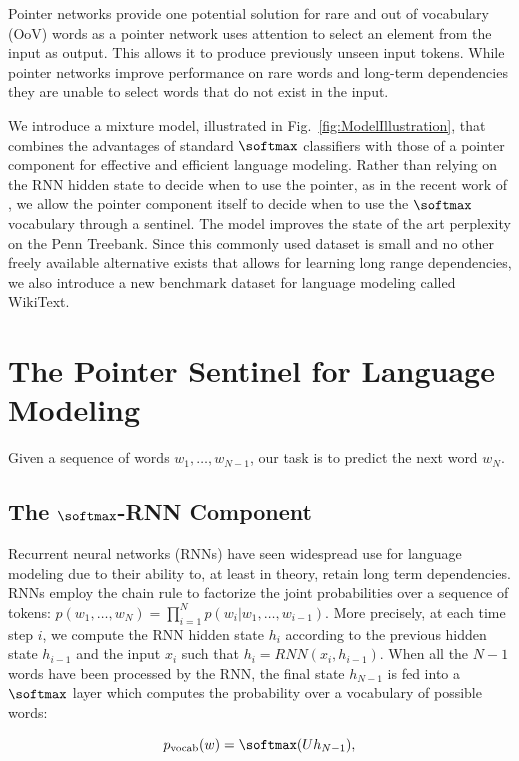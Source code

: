 Pointer networks \cite{Vinyals2015} provide one potential solution for rare and out of vocabulary (OoV) words as a pointer network uses attention to select an element from the input as output. This allows it to produce previously unseen input tokens. While pointer networks improve performance on rare words and long-term dependencies they are unable to select words that do not exist in the input.

We introduce a mixture model, illustrated in Fig.~\ref{fig:ModelIllustration}, that combines the advantages of standard $\softmax$ classifiers with those of a pointer component for effective and efficient language modeling. Rather than relying on the RNN hidden state to decide when to use the pointer, as in the recent work of \citet{Gulcehre2016}, we allow the pointer component itself to decide when to use the $\softmax$ vocabulary through a sentinel. The model improves the state of the art perplexity on the Penn Treebank. Since this commonly used dataset is small and no other freely available alternative exists that allows for learning long range dependencies, we also introduce a new benchmark dataset for language modeling called WikiText.

\section{The Pointer Sentinel for Language Modeling} Given a sequence of words $w_1, \ldots, w_{N-1}$, our task is to predict the next word $w_N$.

\subsection{The $\softmax$-RNN Component} Recurrent neural networks (RNNs) have seen widespread use for language modeling \cite{Mikolov2010} due to their ability to, at least in theory, retain long term dependencies. RNNs employ the chain rule to factorize the joint probabilities over a sequence of tokens: $p(w_1, \ldots, w_N) = \prod^N_{i=1} p(w_i|w_1, \ldots, w_{i-1}).$ More precisely, at each time step $i$, we compute the RNN hidden state $h_i$ according to the previous hidden state $h_{i-1}$ and the input $x_i$ such that $h_i = RNN(x_i, h_{i-1})$. When all the $N-1$ words have been processed by the RNN, the final state $h_{N-1}$ is fed into a $\softmax$ layer which computes the probability over a vocabulary of possible words:

\begin{equation}
p_{\text{vocab}}(w) = \softmax(U h_{N-1}),
\end{equation}

